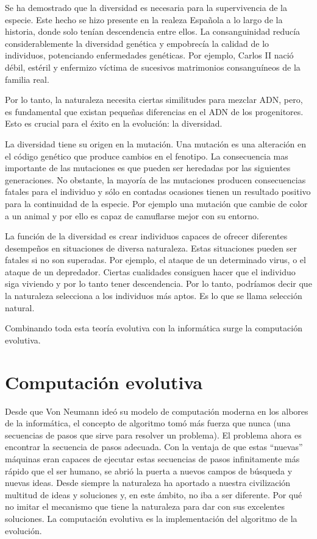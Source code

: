 Se ha demostrado que la diversidad es necesaria para la supervivencia de la
especie. Este hecho se hizo presente en la realeza Española a lo largo de la
historia, donde solo tenían descendencia entre ellos. La consanguinidad reducía
considerablemente la diversidad genética y empobrecía la calidad de lo
individuos, potenciando enfermedades genéticas. Por ejemplo, Carlos II nació
débil, estéril y enfermizo víctima de sucesivos matrimonios consanguíneos de la
familia real.

Por lo tanto, la naturaleza necesita ciertas similitudes para mezclar ADN, pero,
es fundamental que existan pequeñas diferencias en el ADN de los progenitores.
Esto es crucial para el éxito en la evolución: la diversidad.

La diversidad tiene su origen en la mutación. Una mutación es una alteración en
el código genético que produce cambios en el fenotipo. La consecuencia mas
importante de las mutaciones es que pueden ser heredadas por las siguientes
generaciones. No obstante, la mayoría de las mutaciones producen consecuencias
fatales para el individuo y sólo en contadas ocasiones tienen un resultado
positivo para la continuidad de la especie.  Por ejemplo una mutación que
cambie de color a un animal y por ello es capaz de camuflarse mejor con su
entorno.

La función de la diversidad es crear individuos capaces de ofrecer diferentes
desempeños en situaciones de diversa naturaleza. Estas situaciones pueden ser
fatales si no son superadas. Por ejemplo, el ataque de un determinado virus, o el
ataque de un depredador. Ciertas cualidades consiguen hacer que el individuo siga
viviendo y por lo tanto tener descendencia. Por lo tanto, podríamos decir que la
naturaleza selecciona a los individuos más aptos. Es lo que se llama selección
natural.

Combinando toda esta teoría evolutiva con la informática surge la computación
evolutiva.

\section{Computación evolutiva}

Desde que Von Neumann ideó su modelo de computación moderna en los albores de la
informática, el concepto de algoritmo tomó más fuerza que nunca (una secuencias
de pasos que sirve para resolver un problema). El problema ahora es encontrar la
secuencia de pasos adecuada. Con la ventaja de que estas “nuevas” máquinas eran
capaces de ejecutar estas secuencias de pasos infinitamente más rápido que el ser
humano, se abrió la puerta a nuevos campos de búsqueda y nuevas ideas. Desde
siempre la naturaleza ha aportado a nuestra civilización multitud de ideas y
soluciones y, en este ámbito, no iba a ser diferente. Por qué no imitar el
mecanismo que tiene la naturaleza para dar con sus excelentes soluciones. La
computación evolutiva es la implementación del algoritmo de la evolución.

